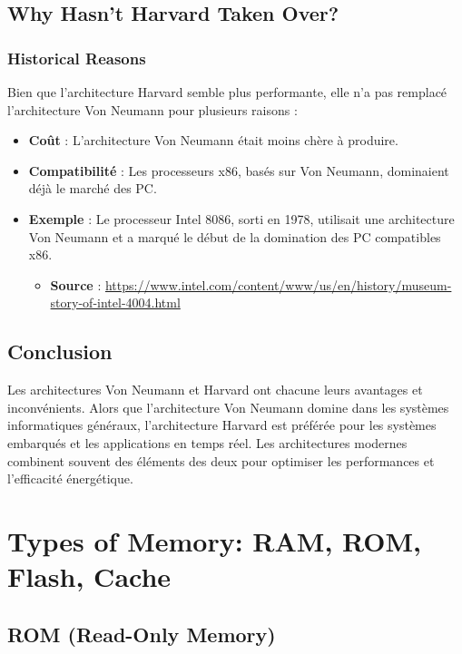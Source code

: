 \documentclass[10pt,a4paper]{article}
\begin{document}
\subsection*{Why Hasn't Harvard Taken Over?}

\subsubsection*{Historical Reasons}
Bien que l'architecture Harvard semble plus performante, elle n'a pas remplacé l'architecture Von Neumann pour plusieurs raisons :
\begin{itemize}
    \item \textbf{Coût} : L'architecture Von Neumann était moins chère à produire.
    \item \textbf{Compatibilité} : Les processeurs x86, basés sur Von Neumann, dominaient déjà le marché des PC.
    \item \textbf{Exemple} : Le processeur Intel 8086, sorti en 1978, utilisait une architecture Von Neumann et a marqué le début de la domination des PC compatibles x86.
    \begin{itemize}
        \item \textbf{Source} : \url{https://www.intel.com/content/www/us/en/history/museum-story-of-intel-4004.html}
    \end{itemize}
\end{itemize}

\subsection*{Conclusion}

Les architectures Von Neumann et Harvard ont chacune leurs avantages et inconvénients. Alors que l'architecture Von Neumann domine dans les systèmes informatiques généraux, l'architecture Harvard est préférée pour les systèmes embarqués et les applications en temps réel. Les architectures modernes combinent souvent des éléments des deux pour optimiser les performances et l'efficacité énergétique.

\section*{Types of Memory: RAM, ROM, Flash, Cache}

\subsection*{ROM (Read-Only Memory)}
\end{document}
